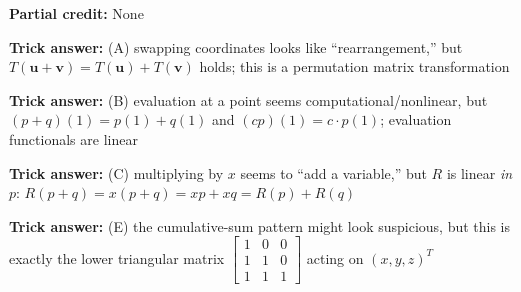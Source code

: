\documentclass[12pt]{amsart}
\begin{document}
\textbf{Partial credit:} None

\textbf{Trick answer:} (A) swapping coordinates looks like ``rearrangement,'' but $T(\mathbf{u} + \mathbf{v}) = T(\mathbf{u}) + T(\mathbf{v})$ holds; this is a permutation matrix transformation

\textbf{Trick answer:} (B) evaluation at a point seems computational/nonlinear, but $(p+q)(1) = p(1) + q(1)$ and $(cp)(1) = c \cdot p(1)$; evaluation functionals are linear

\textbf{Trick answer:} (C) multiplying by $x$ seems to ``add a variable,'' but $R$ is linear \emph{in $p$}: $R(p+q) = x(p+q) = xp + xq = R(p) + R(q)$

\textbf{Trick answer:} (E) the cumulative-sum pattern might look suspicious, but this is exactly the lower triangular matrix $\begin{bmatrix} 1 & 0 & 0 \\ 1 & 1 & 0 \\ 1 & 1 & 1 \end{bmatrix}$ acting on $(x,y,z)^T$
\end{document}
